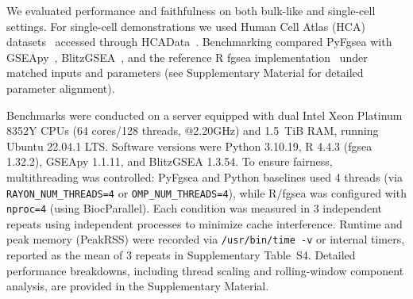 We evaluated performance and faithfulness on both bulk-like and single-cell settings. For single-cell demonstrations we used Human Cell Atlas (HCA) datasets~\cite{ref9} accessed through HCAData~\cite{ref10}. Benchmarking compared PyFgsea with GSEApy~\cite{ref2}, BlitzGSEA~\cite{ref3}, and the reference R fgsea implementation~\cite{ref4} under matched inputs and parameters (see Supplementary Material for detailed parameter alignment).

Benchmarks were conducted on a server equipped with dual Intel Xeon Platinum 8352Y CPUs (64 cores/128 threads, @2.20GHz) and 1.5~TiB RAM, running Ubuntu 22.04.1 LTS. Software versions were Python 3.10.19, R 4.4.3 (fgsea 1.32.2), GSEApy 1.1.11, and BlitzGSEA 1.3.54. To ensure fairness, multithreading was controlled: PyFgsea and Python baselines used 4 threads (via \texttt{RAYON\_NUM\_THREADS=4} or \texttt{OMP\_NUM\_THREADS=4}), while R/fgsea was configured with \texttt{nproc=4} (using BiocParallel). Each condition was measured in 3 independent repeats using independent processes to minimize cache interference. Runtime and peak memory (PeakRSS) were recorded via \texttt{/usr/bin/time -v} or internal timers, reported as the mean of 3 repeats in Supplementary Table~S4. Detailed performance breakdowns, including thread scaling and rolling-window component analysis, are provided in the Supplementary Material.
